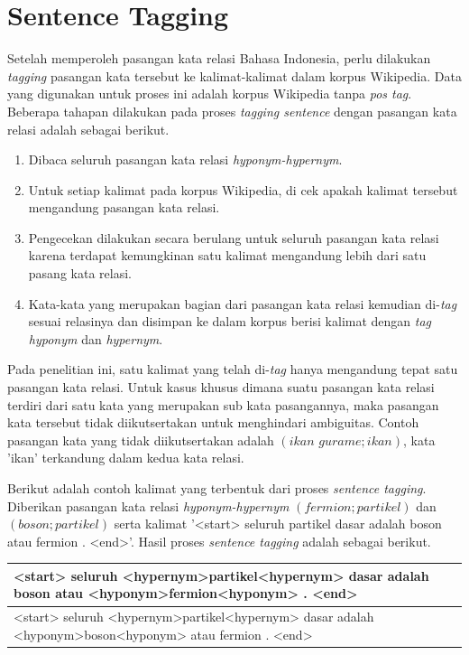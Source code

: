 \section{Sentence Tagging}
Setelah memperoleh pasangan kata relasi Bahasa Indonesia, perlu dilakukan \textit{tagging} pasangan kata tersebut ke kalimat-kalimat dalam korpus Wikipedia. Data yang digunakan untuk proses ini adalah korpus Wikipedia tanpa \textit{pos tag}. Beberapa tahapan dilakukan pada proses \textit{tagging sentence} dengan pasangan kata relasi adalah sebagai berikut.
\begin{enumerate}
  \item Dibaca seluruh pasangan kata relasi \textit{hyponym-hypernym}.
  \item Untuk setiap kalimat pada korpus Wikipedia, di cek apakah kalimat tersebut mengandung pasangan kata relasi.
  \item Pengecekan dilakukan secara berulang untuk seluruh pasangan kata relasi karena terdapat kemungkinan satu kalimat mengandung lebih dari satu pasang kata relasi.
  \item Kata-kata yang merupakan bagian dari pasangan kata relasi kemudian di-\textit{tag} sesuai relasinya dan disimpan ke dalam korpus berisi kalimat dengan \textit{tag} \textit{hyponym} dan \textit{hypernym}.
\end{enumerate}

Pada penelitian ini, satu kalimat yang telah di-\textit{tag} hanya mengandung tepat satu pasangan kata relasi. Untuk kasus khusus dimana suatu pasangan kata relasi terdiri dari satu kata yang merupakan sub kata pasangannya, maka pasangan kata tersebut tidak diikutsertakan untuk menghindari ambiguitas. Contoh pasangan kata yang tidak diikutsertakan adalah $(ikan\,\,gurame;ikan)$, kata 'ikan' terkandung dalam kedua kata relasi. 

Berikut adalah contoh kalimat yang terbentuk dari proses \textit{sentence tagging}. Diberikan pasangan kata relasi \textit{hyponym-hypernym} $(fermion;partikel)$ dan $(boson;partikel)$ serta kalimat  '<start> seluruh partikel dasar adalah boson atau fermion . <end>'. Hasil proses \textit{sentence tagging} adalah sebagai berikut.
\begin{center}
\begin{tabular}{ | m{32em} | } 
\hline
<start> seluruh <hypernym>partikel<hypernym> dasar adalah boson atau <hyponym>fermion<hyponym> . <end> \\ 
\hline
\hline
<start> seluruh <hypernym>partikel<hypernym> dasar adalah <hyponym>boson<hyponym> atau fermion . <end> \\ 
\hline
\end{tabular}
\end{center}


